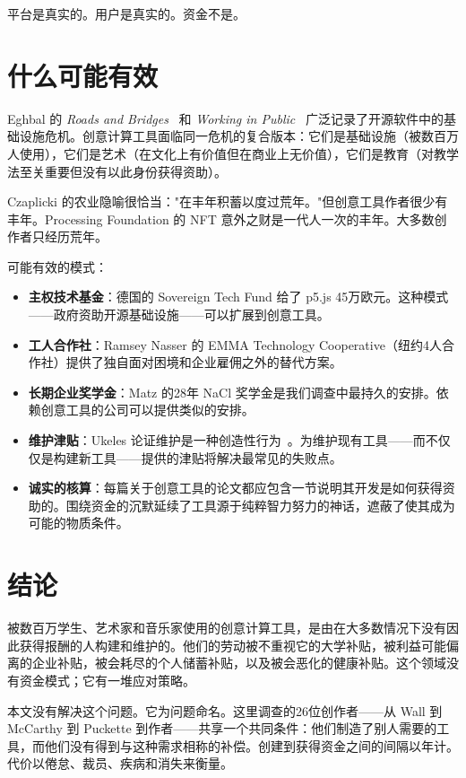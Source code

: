 \documentclass[10pt,letterpaper,twocolumn]{article}
\begin{document}
平台是真实的。用户是真实的。资金不是。

\section{什么可能有效}

Eghbal 的 \emph{Roads and Bridges}~\citep{eghbal2016roads} 和 \emph{Working in Public}~\citep{eghbal2020working} 广泛记录了开源软件中的基础设施危机。创意计算工具面临同一危机的复合版本：它们是基础设施（被数百万人使用），它们是艺术（在文化上有价值但在商业上无价值），它们是教育（对教学法至关重要但没有以此身份获得资助）。

Czaplicki 的农业隐喻很恰当："在丰年积蓄以度过荒年。"但创意工具作者很少有丰年。Processing Foundation 的 NFT 意外之财是一代人一次的丰年。大多数创作者只经历荒年。

可能有效的模式：
\begin{itemize}
  \item \textbf{主权技术基金}：德国的 Sovereign Tech Fund 给了 p5.js 45万欧元。这种模式——政府资助开源基础设施——可以扩展到创意工具。
  \item \textbf{工人合作社}：Ramsey Nasser 的 EMMA Technology Cooperative（纽约4人合作社）提供了独自面对困境和企业雇佣之外的替代方案。
  \item \textbf{长期企业奖学金}：Matz 的28年 NaCl 奖学金是我们调查中最持久的安排。依赖创意工具的公司可以提供类似的安排。
  \item \textbf{维护津贴}：Ukeles 论证维护是一种创造性行为~\citep{ukeles1969manifesto}。为维护现有工具——而不仅仅是构建新工具——提供的津贴将解决最常见的失败点。
  \item \textbf{诚实的核算}：每篇关于创意工具的论文都应包含一节说明其开发是如何获得资助的。围绕资金的沉默延续了工具源于纯粹智力努力的神话，遮蔽了使其成为可能的物质条件。
\end{itemize}

\section{结论}

被数百万学生、艺术家和音乐家使用的创意计算工具，是由在大多数情况下没有因此获得报酬的人构建和维护的。他们的劳动被不重视它的大学补贴，被利益可能偏离的企业补贴，被会耗尽的个人储蓄补贴，以及被会恶化的健康补贴。这个领域没有资金模式；它有一堆应对策略。

本文没有解决这个问题。它为问题命名。这里调查的26位创作者——从 Wall 到 McCarthy 到 Puckette 到作者——共享一个共同条件：他们制造了别人需要的工具，而他们没有得到与这种需求相称的补偿。创建到获得资金之间的间隔以年计。代价以倦怠、裁员、疾病和消失来衡量。
\end{document}
